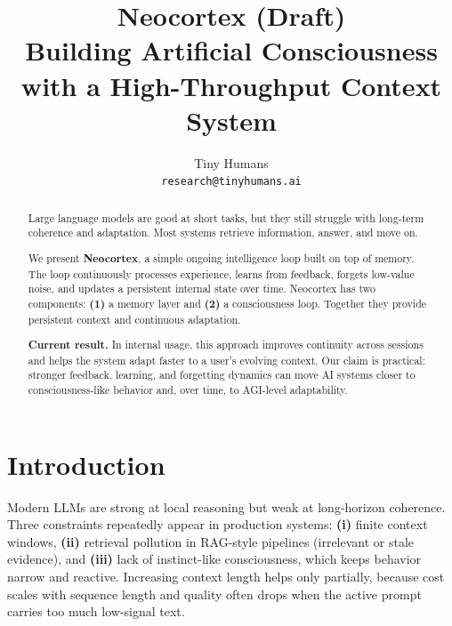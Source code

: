 \documentclass{article}
\title{Neocortex (Draft)\\\large Building Artificial Consciousness with a High-Throughput Context System}
\author{
  Tiny Humans \\
  \texttt{research@tinyhumans.ai} \\
}
\begin{document}
\maketitle
\begin{abstract}
\vspace{-0.2em}
{\small
\begin{minipage}{\linewidth}
\setlength{\parskip}{0.35em}
\noindent
Large language models are good at short tasks, but they still struggle with
long-term coherence and adaptation. Most systems retrieve information, answer,
and move on.

\smallskip\noindent
We present \textbf{Neocortex}, a simple ongoing intelligence loop built on top
of memory. The loop continuously processes experience, learns from feedback,
forgets low-value noise, and updates a persistent internal state over time.
\smallskip\noindent
Neocortex has two components: \textbf{(1)} a memory layer and
\textbf{(2)} a consciousness loop. Together they provide persistent context
and continuous adaptation.

\smallskip\noindent
\textbf{Current result.} In internal usage, this approach improves continuity
across sessions and helps the system adapt faster to a user's evolving context.
Our claim is practical: stronger feedback, learning, and forgetting dynamics
can move AI systems closer to consciousness-like behavior and, over time, to
AGI-level adaptability.
\end{minipage}
}

\end{abstract}


\section{Introduction}

Modern LLMs are strong at local reasoning but weak at long-horizon
coherence. Three constraints repeatedly appear in production systems:
\textbf{(i)} finite context windows, \textbf{(ii)} retrieval pollution in
RAG-style pipelines (irrelevant or stale evidence), and
\textbf{(iii)} lack of instinct-like consciousness, which keeps behavior
narrow and reactive. Increasing context length helps only partially, because
cost scales with sequence length and quality often drops when the active prompt
carries too much low-signal text.
\end{document}
